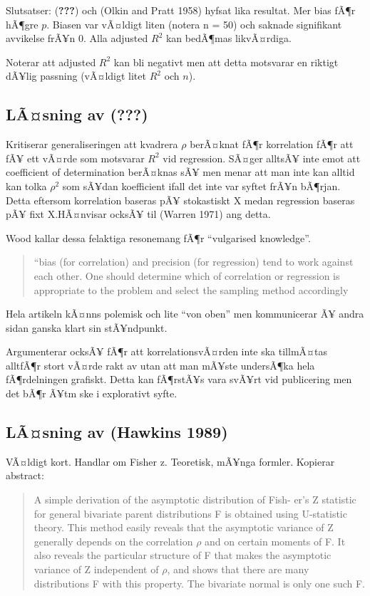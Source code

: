\documentclass[]{article}
\begin{document}
Slutsatser: ({\textbf{???}}) och (Olkin and Pratt 1958) hyfsat lika
resultat. Mer bias fÃ¶r hÃ¶gre \(p\). Biasen var vÃ¤ldigt liten (notera
n = 50) och saknade signifikant avvikelse frÃ¥n 0. Alla adjusted \(R^2\)
kan bedÃ¶mas likvÃ¤rdiga.

Noterar att adjusted \(R^2\) kan bli negativt men att detta motsvarar en
riktigt dÃ¥lig passning (vÃ¤ldigt litet \(R^2\) och \(n\)).

\subsection{\texorpdfstring{LÃ¤sning av
({\textbf{???}})}{LÃ¤sning av (???)}}\label{lasning-av-wood1986}

Kritiserar generaliseringen att kvadrera \(\rho\) berÃ¤knat fÃ¶r
korrelation fÃ¶r att fÃ¥ ett vÃ¤rde som motsvarar \(R^2\) vid
regression. SÃ¤ger alltsÃ¥ inte emot att coefficient of determination
berÃ¤knas sÃ¥ men menar att man inte kan alltid kan tolka \(\rho^2\) som
sÃ¥dan koefficient ifall det inte var syftet frÃ¥n bÃ¶rjan. Detta
eftersom korrelation baseras pÃ¥ stokastiskt X medan regression baseras
pÃ¥ fixt X.HÃ¤nvisar ocksÃ¥ til (Warren 1971) ang detta.

Wood kallar dessa felaktiga resonemang fÃ¶r ``vulgarised knowledge''.

\begin{quote}
``bias (for correlation) and precision (for regression) tend to work
against each other. One should determine which of correlation or
regression is appropriate to the problem and select the sampling method
accordingly
\end{quote}

Hela artikeln kÃ¤nns polemisk och lite ``von oben'' men kommunicerar Ã¥
andra sidan ganska klart sin stÃ¥ndpunkt.

Argumenterar ocksÃ¥ fÃ¶r att korrelationsvÃ¤rden inte ska tillmÃ¤tas
alltfÃ¶r stort vÃ¤rde rakt av utan att man mÃ¥ste undersÃ¶ka hela
fÃ¶rdelningen grafiskt. Detta kan fÃ¶rstÃ¥s vara svÃ¥rt vid publicering
men det bÃ¶r Ã¥tm ske i explorativt syfte.

\subsection{LÃ¤sning av (Hawkins 1989)}\label{lasning-av-hawkins1989}

VÃ¤ldigt kort. Handlar om Fisher z. Teoretisk, mÃ¥nga formler. Kopierar
abstract:

\begin{quote}
A simple derivation of the asymptotic distribution of Fish- er's Z
statistic for general bivariate parent distributions F is obtained using
U-statistic theory. This method easily reveals that the asymptotic
variance of Z generally depends on the correlation \(\rho\) and on
certain moments of F. It also reveals the particular structure of F that
makes the asymptotic variance of Z independent of \(\rho\), and shows
that there are many distributions F with this property. The bivariate
normal is only one such F.
\end{quote}
\end{document}
